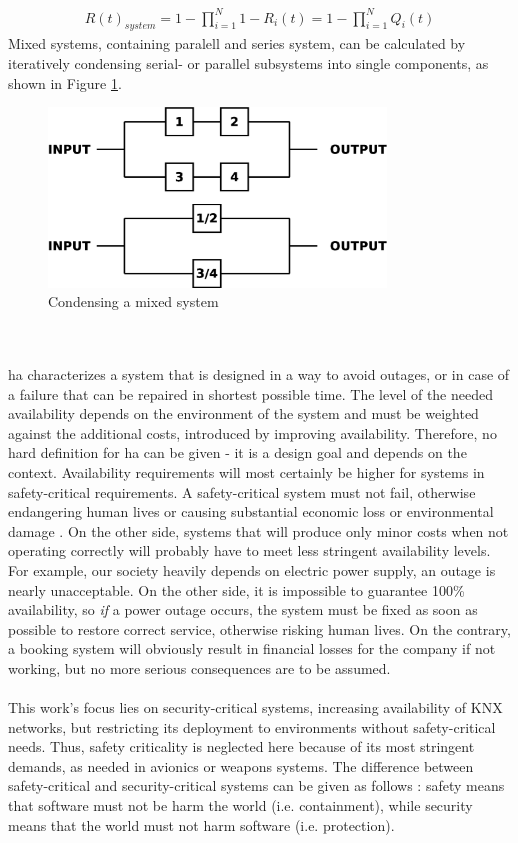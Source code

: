 \begin{align}\label{parallelSysEqu}
 R(t)_{system} = 1 - \prod_{i=1}^{N} 1- R_{i}(t) = 1 - \prod_{i=1}^{N} Q_{i}(t)
\end{align}
Mixed systems, containing paralell and series system, can be calculated by iteratively condensing serial- or parallel subsystems into single components,
as shown in Figure \ref{fig:mixedSys}.
\begin{figure}
    \centering
    \includegraphics[width=0.8\textwidth]{figures/mixedSys.eps}
    \caption{Condensing a mixed system}
    \label{fig:mixedSys}
\end{figure}
\\
\\
\gls{ha} characterizes a system that is designed in a way to avoid outages, or in case of a failure that can be repaired in shortest possible time. 
The level of the needed availability depends on the environment of the system and must be weighted against the additional costs, introduced by improving availability.
Therefore, no hard definition for \gls{ha} can be given - it is a design goal and depends on the context. Availability requirements will most certainly be higher
for systems in safety-critical requirements. A safety-critical system must not fail, otherwise endangering human lives or 
causing substantial economic loss or environmental damage \cite{1007998}.
On the other side, systems that will produce only minor costs when not operating correctly
will probably have to meet less stringent availability levels.
\\
For example, our society heavily depends on electric power supply, an outage
is nearly unacceptable. On the other side, it is impossible to guarantee 100\% availability, so \textit{if} a power outage occurs, the system must be fixed as soon as
possible to restore correct service, otherwise risking human lives. On the contrary, a booking system will obviously result in financial losses for the company 
if not working, but no more serious consequences are to be assumed.
\\
\\
This work's focus lies on security-critical systems, increasing availability of KNX networks, but restricting its
deployment to environments without safety-critical needs. Thus, safety criticality is neglected here because of its most stringent demands, as needed in
avionics or weapons systems.
The difference between safety-critical and security-critical systems can be given as follows \cite{5784222}: safety means that software must not be harm the 
world (i.e. containment), while security means that the world must not harm software (i.e. protection).

